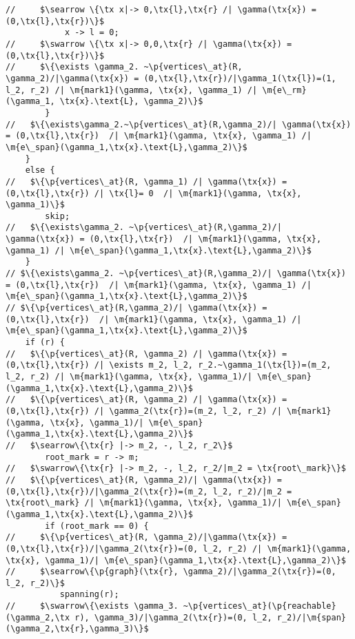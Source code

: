 \begin{figure*}
\begin{lstlisting}
//     $\searrow \{\tx x|-> 0,\tx{l},\tx{r} /| \gamma(\tx{x}) = (0,\tx{l},\tx{r})\}$
            x -> l = 0;
//     $\swarrow \{\tx x|-> 0,0,\tx{r} /| \gamma(\tx{x}) = (0,\tx{l},\tx{r})\}$
//     $\{\exists \gamma_2. ~\p{vertices\_at}(R, \gamma_2)/|\gamma(\tx{x}) = (0,\tx{l},\tx{r})/|\gamma_1(\tx{l})=(1, l_2, r_2) /| \m{mark1}(\gamma, \tx{x}, \gamma_1) /| \m{e\_rm}(\gamma_1, \tx{x}.\text{L}, \gamma_2)\}$
        }
//   $\{\exists\gamma_2.~\p{vertices\_at}(R,\gamma_2)/| \gamma(\tx{x}) = (0,\tx{l},\tx{r})  /| \m{mark1}(\gamma, \tx{x}, \gamma_1) /| \m{e\_span}(\gamma_1,\tx{x}.\text{L},\gamma_2)\}$
    }
    else {
//   $\{\p{vertices\_at}(R, \gamma_1) /| \gamma(\tx{x}) = (0,\tx{l},\tx{r}) /| \tx{l}= 0  /| \m{mark1}(\gamma, \tx{x}, \gamma_1)\}$
        skip;
//   $\{\exists\gamma_2. ~\p{vertices\_at}(R,\gamma_2)/| \gamma(\tx{x}) = (0,\tx{l},\tx{r})  /| \m{mark1}(\gamma, \tx{x}, \gamma_1) /| \m{e\_span}(\gamma_1,\tx{x}.\text{L},\gamma_2)\}$
    }
// $\{\exists\gamma_2. ~\p{vertices\_at}(R,\gamma_2)/| \gamma(\tx{x}) = (0,\tx{l},\tx{r})  /| \m{mark1}(\gamma, \tx{x}, \gamma_1) /| \m{e\_span}(\gamma_1,\tx{x}.\text{L},\gamma_2)\}$
// $\{\p{vertices\_at}(R,\gamma_2)/| \gamma(\tx{x}) = (0,\tx{l},\tx{r})  /| \m{mark1}(\gamma, \tx{x}, \gamma_1) /|  \m{e\_span}(\gamma_1,\tx{x}.\text{L},\gamma_2)\}$
    if (r) {
//   $\{\p{vertices\_at}(R, \gamma_2) /| \gamma(\tx{x}) = (0,\tx{l},\tx{r}) /| \exists m_2, l_2, r_2.~\gamma_1(\tx{l})=(m_2, l_2, r_2) /| \m{mark1}(\gamma, \tx{x}, \gamma_1)/| \m{e\_span}(\gamma_1,\tx{x}.\text{L},\gamma_2)\}$
//   $\{\p{vertices\_at}(R, \gamma_2) /| \gamma(\tx{x}) = (0,\tx{l},\tx{r}) /| \gamma_2(\tx{r})=(m_2, l_2, r_2) /| \m{mark1}(\gamma, \tx{x}, \gamma_1)/| \m{e\_span}(\gamma_1,\tx{x}.\text{L},\gamma_2)\}$
//   $\searrow\{\tx{r} |-> m_2, -, l_2, r_2\}$
        root_mark = r -> m;
//   $\swarrow\{\tx{r} |-> m_2, -, l_2, r_2/|m_2 = \tx{root\_mark}\}$
//   $\{\p{vertices\_at}(R, \gamma_2)/| \gamma(\tx{x}) = (0,\tx{l},\tx{r})/|\gamma_2(\tx{r})=(m_2, l_2, r_2)/|m_2 = \tx{root\_mark} /| \m{mark1}(\gamma, \tx{x}, \gamma_1)/| \m{e\_span}(\gamma_1,\tx{x}.\text{L},\gamma_2)\}$
        if (root_mark == 0) {
//     $\{\p{vertices\_at}(R, \gamma_2)/|\gamma(\tx{x}) = (0,\tx{l},\tx{r})/|\gamma_2(\tx{r})=(0, l_2, r_2) /| \m{mark1}(\gamma, \tx{x}, \gamma_1)/| \m{e\_span}(\gamma_1,\tx{x}.\text{L},\gamma_2)\}$
//     $\searrow\{\p{graph}(\tx{r}, \gamma_2)/|\gamma_2(\tx{r})=(0, l_2, r_2)\}$
           spanning(r);
//     $\swarrow\{\exists \gamma_3. ~\p{vertices\_at}(\p{reachable}(\gamma_2,\tx r), \gamma_3)/|\gamma_2(\tx{r})=(0, l_2, r_2)/|\m{span}(\gamma_2,\tx{r},\gamma_3)\}$

\end{lstlisting}
\end{figure*}
